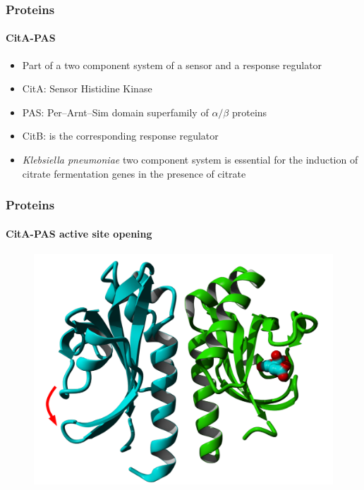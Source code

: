 \documentclass[english]{beamer}
\begin{document}

\begin{frame}
    \frametitle{Proteins}
    \framesubtitle{CitA-PAS}

    \begin{itemize}
        \item Part of a two component system of a sensor and a response regulator
        \item CitA: Sensor Histidine Kinase
        \item PAS: Per--Arnt--Sim domain superfamily of $\alpha/\beta$ proteins
        \item CitB: is the corresponding response regulator
        \item \textit{Klebsiella pneumoniae} two component system is essential for the induction of citrate fermentation genes in the presence of citrate
    \end{itemize}
\end{frame} 


\begin{frame}
    \frametitle{Proteins}
    \framesubtitle{CitA-PAS active site opening}
    \begin{figure}
        \includegraphics[width=.8\linewidth]{figures/CitA_dimer.pdf}
    \end{figure}      

\end{frame}   

\end{document}
